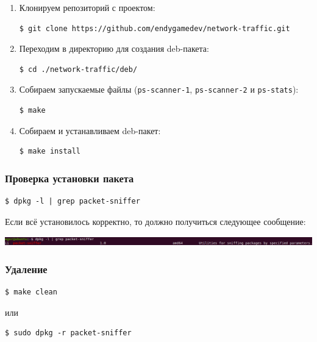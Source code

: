\begin{enumerate}
\item Клонируем репозиторий с проектом:
\begin{lstlisting}
$ git clone https://github.com/endygamedev/network-traffic.git
\end{lstlisting}

\newpage

\item Переходим в директорию для создания deb-пакета:
\begin{lstlisting}
$ cd ./network-traffic/deb/
\end{lstlisting}

\item Собираем запускаемые файлы (\verb|ps-scanner-1|, \verb|ps-scanner-2| и \verb|ps-stats|):
\begin{lstlisting}
$ make
\end{lstlisting}

\item Собираем и устанавливаем deb-пакет:
\begin{lstlisting}
$ make install
\end{lstlisting}
\end{enumerate}

\subsubsection*{Проверка установки пакета}

\begin{lstlisting}
$ dpkg -l | grep packet-sniffer
\end{lstlisting}
\indent Если всё установилось корректно, то должно получиться следующее сообщение:
\vspace{-0.8cm}
\begin{center}
    \includegraphics[scale=0.32]{../assets/check.png}
\end{center}

\subsubsection*{Удаление}

\begin{lstlisting}
$ make clean
\end{lstlisting}
или
\begin{lstlisting}
$ sudo dpkg -r packet-sniffer
\end{lstlisting}
